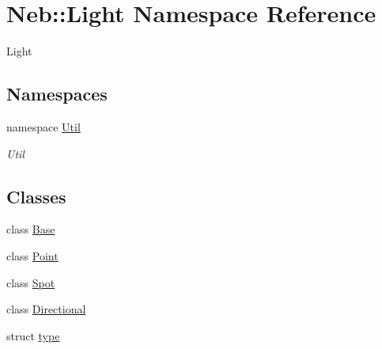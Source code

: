 \hypertarget{namespaceNeb_1_1Light}{\section{\-Neb\-:\-:\-Light \-Namespace \-Reference}
\label{namespaceNeb_1_1Light}
}


\-Light  


\subsection*{\-Namespaces}
\begin{DoxyCompactItemize}
\item 
namespace \hyperlink{namespaceNeb_1_1Light_1_1Util}{\-Util}
\begin{DoxyCompactList}\small\item\em \-Util \end{DoxyCompactList}\end{DoxyCompactItemize}
\subsection*{\-Classes}
\begin{DoxyCompactItemize}
\item 
class \hyperlink{classNeb_1_1Light_1_1Base}{\-Base}
\item 
class \hyperlink{classNeb_1_1Light_1_1Point}{\-Point}
\item 
class \hyperlink{classNeb_1_1Light_1_1Spot}{\-Spot}
\item 
class \hyperlink{classNeb_1_1Light_1_1Directional}{\-Directional}
\item 
struct \hyperlink{structNeb_1_1Light_1_1type}{type}
\end{DoxyCompactItemize}
